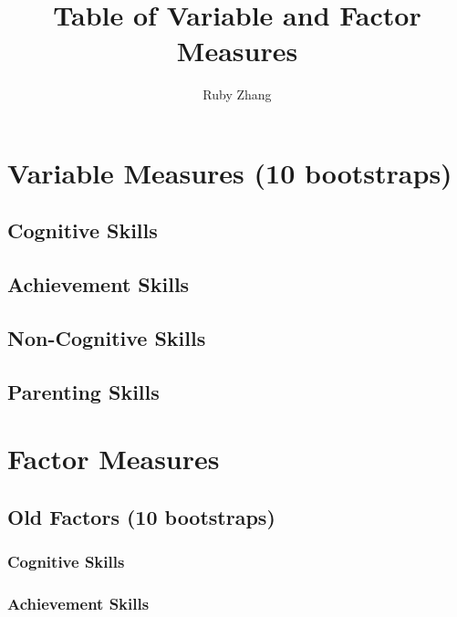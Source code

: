 \documentclass[11pt]{article}
\begin{document}
\title{Table of Variable and Factor Measures}
\author{Ruby Zhang}
\maketitle

\section{Variable Measures (10 bootstraps)}

  \subsection{Cognitive Skills}
  

  \subsection{Achievement Skills}
  

  \subsection{Non-Cognitive Skills}
  

  \subsection{Parenting Skills}
  

\newpage

\section{Factor Measures}

  \subsection{Old Factors (10 bootstraps)}

    \subsubsection{Cognitive Skills}
    

    \subsubsection{Achievement Skills}
    
\end{document}
